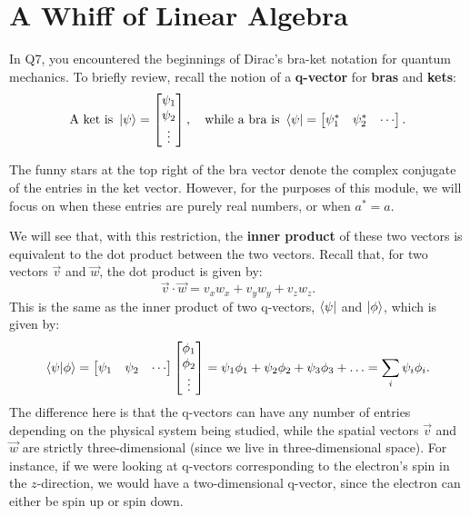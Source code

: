 \documentclass{article}
\begin{document}

\section*{A Whiff of Linear Algebra}

    In Q7, you encountered the beginnings of Dirac's bra-ket notation for quantum mechanics. To briefly review, recall the notion of a \textbf{q-vector} for \textbf{bras} and \textbf{kets}:
    \[
    \text{A ket is }\ket{\psi} = \begin{bmatrix}
    \psi_1 \\
    \psi_2 \\
    \vdots
    \end{bmatrix}
    ,
    \quad 
    \text{while a bra is }\bra{\psi} = \begin{bmatrix}
    \psi_1^* &
    \psi_2^* &
    \cdots
    \end{bmatrix}.
    \]

    The funny stars at the top right of the bra vector denote the complex conjugate of the entries in the ket vector. However, for the purposes of this module, we will focus on when these entries are purely real numbers, or when $a^*=a$.

    \vspace{1em}

    We will see that, with this restriction, the \textbf{inner product} of these two vectors is equivalent to the dot product between the two vectors. Recall that, for two vectors $\vec{v}$ and $\vec{w}$, the dot product is given by:
    \[
    \vec{v} \cdot \vec{w} = v_x w_x + v_y w_y + v_z w_z.
    \]
    This is the same as the inner product of two q-vectors, $\bra{\psi}$ and $\ket{\phi}$, which is given by:
    \[
    \braket{\psi}{\phi} = \begin{bmatrix}
    \psi_1 &
    \psi_2 &
    \cdots
    \end{bmatrix}
    \begin{bmatrix}
    \phi_1 \\
    \phi_2 \\
    \vdots
    \end{bmatrix} =
    \psi_1\phi_1 + \psi_2\phi_2 + \psi_3\phi_3 + \ldots = \sum_i \psi_i \phi_i.
    \]
    The difference here is that the q-vectors can have any number of entries depending on the physical system being studied, while the spatial vectors $\vec{v}$ and $\vec{w}$ are strictly three-dimensional (since we live in three-dimensional space). For instance, if we were looking at q-vectors corresponding to the electron's spin in the $z$-direction, we would have a two-dimensional q-vector, since the electron can either be spin up or spin down. 
    
\end{document}
